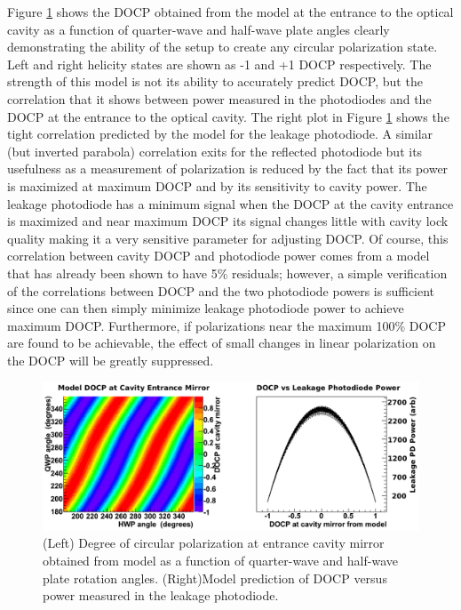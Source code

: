 Figure \ref{fig:DOCPvsRRPD} shows the DOCP obtained from the model at the entrance to the optical cavity as a function of quarter-wave and half-wave plate angles clearly demonstrating the ability of the setup to create any circular polarization state. Left and right helicity states are shown as -1 and +1 DOCP respectively. The strength of this model is not its ability to accurately predict DOCP, but the correlation that it shows between power measured in the photodiodes and the DOCP at the entrance to the optical cavity. The right plot in Figure \ref{fig:DOCPvsRRPD} shows the tight correlation predicted by the model for the leakage photodiode. A similar (but inverted parabola) correlation exits for the reflected photodiode but its usefulness as a measurement of polarization is reduced by the fact that its power is maximized at maximum DOCP and by its sensitivity to cavity power. The leakage photodiode has a minimum signal when the DOCP at the cavity entrance is maximized and near maximum DOCP its signal changes little with cavity lock quality making it a very sensitive parameter for adjusting DOCP. Of course, this correlation between cavity DOCP and photodiode power comes from a model that has already been shown to have 5\% residuals; however, a simple verification of the correlations between DOCP and the two photodiode powers is sufficient since one can then simply minimize leakage photodiode power to achieve maximum DOCP. Furthermore, if polarizations near the maximum 100\% DOCP are found to be achievable, the effect of small changes in linear polarization on the DOCP will be greatly suppressed.

\begin{figure}[ht]
\centering
\includegraphics[width=5.6in]{./Pictures/DOCPvsRRPD.png}
\caption{\label{fig:DOCPvsRRPD}(Left) Degree of circular polarization  at entrance cavity mirror obtained from model as a function of quarter-wave and half-wave plate rotation angles. (Right)Model prediction of DOCP versus power measured in the leakage photodiode.}
\end{figure}

